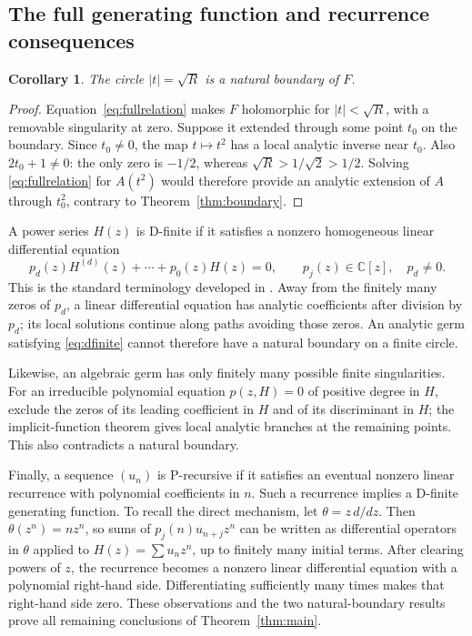 \documentclass[11pt,letterpaper]{article}
\numberwithin{equation}{section}
\newtheorem{corollary}[theorem]{Corollary}
\theoremstyle{definition}
\theoremstyle{remark}
\newcommand{\C}{\mathbb{C}}
\begin{document}
\subsection{The full generating function and recurrence consequences}
\begin{corollary}\label{cor:fullboundary}
The circle $|t|=\sqrt R$ is a natural boundary of $F$.
\end{corollary}
\begin{proof}
Equation~\eqref{eq:fullrelation} makes $F$ holomorphic for
$|t|<\sqrt R$, with a removable singularity at zero. Suppose it extended
through some point $t_0$ on the boundary. Since $t_0\ne0$, the map
$t\mapsto t^2$ has a local analytic inverse near $t_0$. Also
$2t_0+1\ne0$: the only zero is $-1/2$, whereas
$\sqrt R>1/\sqrt2>1/2$. Solving \eqref{eq:fullrelation} for $A(t^2)$ would
therefore provide an analytic extension of $A$ through $t_0^2$, contrary
to Theorem~\ref{thm:boundary}.
\end{proof}

A power series $H(z)$ is D-finite if it satisfies a nonzero homogeneous
linear differential equation
\begin{equation}\label{eq:dfinite}
 p_d(z)H^{(d)}(z)+\cdots+p_0(z)H(z)=0,
 \qquad p_j(z)\in\C[z],\quad p_d\ne0.
\end{equation}
This is the standard terminology developed in \cite{StanleyDFinite}.
Away from the finitely many zeros of $p_d$, a linear differential equation
has analytic coefficients after division by $p_d$; its local solutions
continue along paths avoiding those zeros. An analytic germ satisfying
\eqref{eq:dfinite} cannot therefore have a natural boundary on a finite
circle.

Likewise, an algebraic germ has only finitely many possible finite
singularities. For an irreducible polynomial equation $p(z,H)=0$ of positive degree in $H$, exclude
the zeros of its leading coefficient in $H$ and of its discriminant in
$H$; the implicit-function theorem gives local analytic branches at the
remaining points. This also contradicts a natural boundary.

Finally, a sequence $(u_n)$ is P-recursive if it satisfies an eventual
nonzero linear recurrence with polynomial coefficients in $n$. Such a
recurrence implies a D-finite generating function. To recall the direct
mechanism, let $\theta=z\,d/dz$. Then $\theta(z^n)=nz^n$, so sums of
$p_j(n)u_{n+j}z^n$ can be written as differential operators in $\theta$
applied to $H(z)=\sum u_nz^n$, up to finitely many initial terms.
After clearing powers of $z$, the recurrence becomes a nonzero linear
differential equation with a polynomial right-hand side. Differentiating
sufficiently many times makes that right-hand side zero. These observations
and the two natural-boundary results prove all remaining conclusions of
Theorem~\ref{thm:main}.
\end{document}
